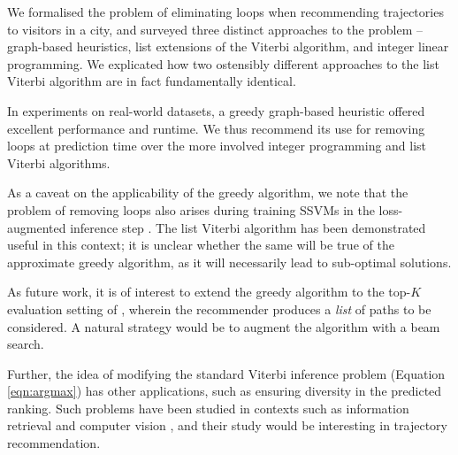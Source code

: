 
We formalised the problem of eliminating loops when recommending trajectories to visitors in a city,
and surveyed three distinct approaches to the problem --
graph-based heuristics,
list extensions of the Viterbi algorithm,
and integer linear programming.
We explicated how two ostensibly different approaches to the list Viterbi algorithm \citep{seshadri1994list,nilsson2001sequentially} are in fact fundamentally identical.

In experiments on real-world datasets,
a greedy graph-based heuristic offered excellent performance and runtime.
We thus recommend its use
for removing loops at prediction time
over the more involved integer programming and list Viterbi algorithms.

As a caveat on the applicability of the greedy algorithm,
we note that the problem of removing loops also arises during training SSVMs in the loss-augmented inference step \citep{Chen:2017}.
The list Viterbi algorithm has been demonstrated useful in this context;
it is unclear whether the same will be true of the approximate greedy algorithm, as it will necessarily lead to sub-optimal solutions.

As future work, it is of interest to extend the greedy algorithm to the top-$K$ evaluation setting of \citet{Chen:2017}, wherein the recommender produces a \emph{list} of paths to be considered.
A natural strategy would be to augment the algorithm with a beam search.

Further, the idea of modifying the standard Viterbi inference problem (Equation \ref{eqn:argmax}) has other applications, such
as ensuring diversity in the predicted ranking.
Such problems have been studied in contexts such as information retrieval \citep{Carbonell:1998} and computer vision \citep{Park:2011},
and their study would be interesting in trajectory recommendation.

